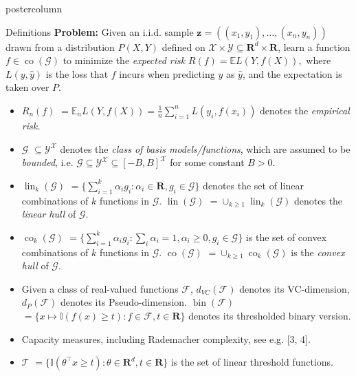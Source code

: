 \documentclass{beamer}
\newcommand{\E}{{\mathbb E}}
\newcommand{\setF}{{\mathcal F}}
\newcommand{\setG}{{\mathcal G}}
\newcommand{\setT}{{\mathcal T}}
\newcommand{\setX}{{\mathcal X}}
\newcommand{\setY}{{\mathcal Y}}
\newcommand{\bz}{{\mathbf z}}
\newcommand{\I}{{\mathbb I}}
\newcommand{\realnum}{{\mathbf R}}
\DeclareMathOperator{\conv}{co}
\DeclareMathOperator{\lin}{lin}
\DeclareMathOperator{\bin}{bin}
\newcommand{\citep}{\cite}
\begin{document}
\begin{frame}
\begin{columns}
\begin{column}{.37\textwidth}
\begin{beamercolorbox}[center]{postercolumn}
\begin{minipage}{.98\textwidth}
{\begin{myblock}{Definitions}
\textbf{{\color{blue}Problem:}} Given an i.i.d. sample 
$\bz = ((x_{1}, y_{1}), \ldots, (x_{n}, y_{n}))$ drawn from a distribution
$P(X, Y)$ defined on $\setX \times \setY \subseteq \realnum^d \times \realnum$, learn a function $f \in \conv(\setG)$ to minimize the \emph{expected risk} 
$R(f) = \E L(Y, f(X)),$ where $L(y, \hat{y})$ is the loss that $f$ incurs when
predicting $y$ as $\hat{y}$, and the expectation is taken over $P$. 

\begin{itemize}
\setlength\itemsep{0.3em}

\item
{\color{blue}$R_{n}(f)$}
$= \E_{n} L(Y, f(X))
= \frac{1}{n} \sum_{i=1}^{n} L(y_{i}, f(x_{i}))$ denotes the \emph{\color{blue}empirical risk.} 

\item
{\color{blue}$\setG$}
$\subseteq \setY^{\setX}$ denotes the \emph{\color{blue}class of basis models/functions}, which are assumed to be \emph{bounded}, i.e.  
$\setG \subseteq \setY^{\setX} \subseteq [-B, B]^{\setX}$ 
for some constant $B > 0$. 

\item
{\color{blue}$\lin_{k}(\setG)$} 
$= \{\sum_{i=1}^{k} \alpha_{i} g_{i}: 
\alpha_{i} \in \realnum,
g_{i} \in \setG\}$ denotes the set of linear combinations of $k$
functions in $\setG$. {\color{blue}$\lin(\setG)$} $= \cup_{k \ge 1} \lin_{k}(\setG)$ denotes the \emph{\color{blue}linear hull} of $\setG$.

\item
{\color{blue}$\conv_{k}(\setG)$}
$= \{\sum_{i=1}^{k} \alpha_{i} g_{i}:
	\sum_{i} \alpha_{i} = 1, 
	\alpha_{i} \ge 0,
	g_{i} \in \setG\}$ is the set of convex combinations of $k$ functions in
$\setG$. 
{\color{blue}$\conv(\setG)$} $= \cup_{k \ge 1} \conv_{k}(\setG)$ is the \emph{\color{blue}convex hull} of $\setG$.

\item
Given a class of real-valued functions $\setF$,
{\color{blue}$d_{VC}(\setF)$} denotes its VC-dimension, 
{\color{blue}$d_{P}(\setF)$} denotes its Pseudo-dimension. 
{\color{blue}$\bin(\setF)$} $= \{x \mapsto \I(f(x) \ge t): f \in \setF, t \in \realnum\}$ denotes its thresholded binary version. 

\item
{\color{blue}Capacity measures}, including {\color{blue}Rademacher complexity}, see e.g. [3, 4].

\item
{\color{blue}$\setT$} $= \{\I(\theta^{\top} x \ge t): \theta \in \realnum^{d}, t \in \realnum\}$ is the set of linear threshold functions.


\end{itemize}
\end{myblock}}
\end{minipage}
\end{beamercolorbox}
\end{column}
\end{columns}
\end{frame}
\end{document}
